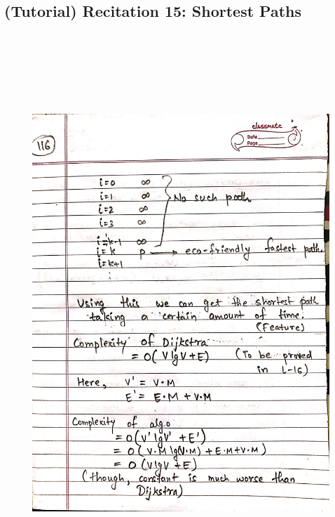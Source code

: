 \newpage
{\color{black} \subsection*{(Tutorial) Recitation 15: Shortest Paths}}
\begin{figure}[H]
    \centering
    \includegraphics[width=16cm, height=21cm]{"./MIT-6.006/MIT-6006-116"}
\end{figure}

